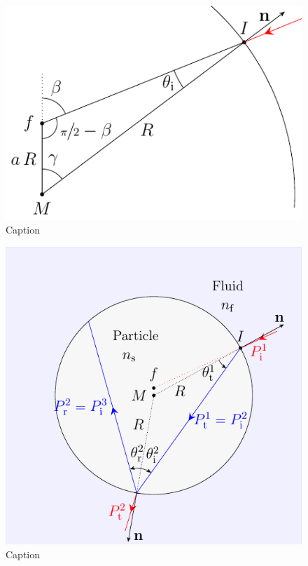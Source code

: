\lipsum[1-2]

\begin{figure}[htp]
  \centering
  \includegraphics[]{Plots/cache/angles.pdf}
  \caption{Caption}
  \label{fig:Th-angles}
\end{figure}

\lipsum[1-2]

\begin{figure}[htp]
  \centering
  \includegraphics[]{Plots/cache/ray.pdf}
  \caption{Caption}
  \label{fig:Th-ray_particle}
\end{figure}

